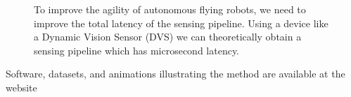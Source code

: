 \begin{figure}[b]
\begin{centering}
\par\end{centering}

\begin{centering}
\par\end{centering}

\caption{\label{fig:Discretization-and-latency}To improve the agility of autonomous
flying robots, we need to improve the total latency of the sensing
pipeline. Using a device like a Dynamic Vision Sensor (DVS) we can
theoretically obtain a sensing pipeline which has microsecond latency.}
\end{figure}




Software, datasets, and animations illustrating the method are available
at the website \xxx
